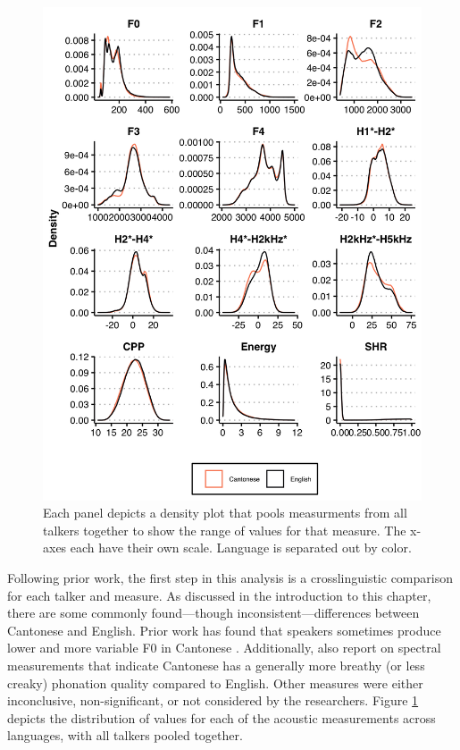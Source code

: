 \begin{figure}[ptbh]
    \begin{center}
    \includegraphics[width=0.9\linewidth]{figures/ch3_allmeasuresdensity_5in.png} 
    \caption{Each panel depicts a density plot that pools measurments from all talkers together to show the range of values for that measure. The x-axes each have their own scale. Language is separated out by color.}
    \label{ch3:fig:allmeasures}
    \end{center}
\end{figure} 

Following prior work, the first step in this analysis is a crosslinguistic comparison for each talker and measure. As discussed in the introduction to this chapter, there are some commonly found---though inconsistent---differences between Cantonese and English. Prior work has found that speakers sometimes produce lower and more variable F0 in Cantonese \citep{altenberg_2006_f0,ng_2012_ltas,ng_2010_voice}. Additionally, \citet{ng_2012_ltas} also report on spectral measurements that indicate Cantonese has a generally more breathy (or less creaky) phonation quality compared to English. Other measures were either inconclusive, non-significant, or not considered by the researchers. Figure \ref{ch3:fig:allmeasures} depicts the distribution of values for each of the acoustic measurements across languages, with all talkers pooled together. 

